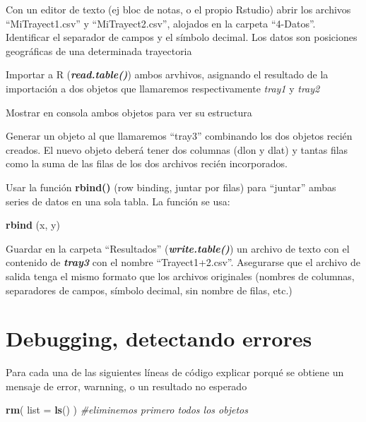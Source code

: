 \documentclass[]{book}
\newenvironment{Shaded}{\begin{snugshade}}{\end{snugshade}}
\newcommand{\CommentTok}[1]{\textcolor[rgb]{0.56,0.35,0.01}{\textit{#1}}}
\newcommand{\DataTypeTok}[1]{\textcolor[rgb]{0.13,0.29,0.53}{#1}}
\newcommand{\KeywordTok}[1]{\textcolor[rgb]{0.13,0.29,0.53}{\textbf{#1}}}
\newcommand{\NormalTok}[1]{#1}
\begin{document}
Con un editor de texto (ej bloc de notas, o el propio Rstudio) abrir los archivos ``MiTrayect1.csv'' y ``MiTrayect2.csv'', alojados en la carpeta ``4-Datos''. Identificar el separador de campos y el símbolo decimal. Los datos son posiciones geográficas de una determinada trayectoria

Importar a R (\textbf{\emph{read.table()}}) ambos arvhivos, asignando el resultado de la importación a dos objetos que llamaremos respectivamente \emph{tray1} y \emph{tray2}

Mostrar en consola ambos objetos para ver su estructura

Generar un objeto al que llamaremos ``tray3'' combinando los dos objetos recién creados. El nuevo objeto deberá tener dos columnas (dlon y dlat) y tantas filas como la suma de las filas de los dos archivos recién incorporados.

Usar la función \textbf{rbind()} (row binding, juntar por filas) para ``juntar'' ambas series de datos en una sola tabla. La función se usa:

\begin{Shaded}
\begin{Highlighting}[]
\KeywordTok{rbind}\NormalTok{ (x, y)}
\end{Highlighting}
\end{Shaded}

Guardar en la carpeta ``Resultados'' (\textbf{\emph{write.table()}}) un archivo de texto con el contenido de \emph{\textbf{tray3}} con el nombre ``Trayect1+2.csv''. Asegurarse que el archivo de salida tenga el mismo formato que los archivos originales (nombres de columnas, separadores de campos, símbolo decimal, sin nombre de filas, etc.)

\hypertarget{debugging-detectando-errores-3}{%
\section{Debugging, detectando errores}\label{debugging-detectando-errores-3}}

Para cada una de las siguientes líneas de código explicar porqué se obtiene un mensaje de error, warnning, o un resultado no esperado

\begin{Shaded}
\begin{Highlighting}[]
\KeywordTok{rm}\NormalTok{( }\DataTypeTok{list =} \KeywordTok{ls}\NormalTok{() ) }\CommentTok{#eliminemos primero todos los objetos}
\end{Highlighting}
\end{Shaded}
\end{document}
